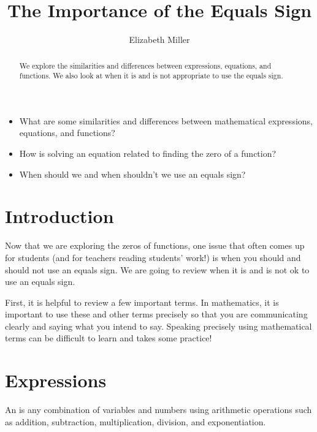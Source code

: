 \documentclass{ximera}
\author{Elizabeth Miller}
\title{The Importance of the Equals Sign}
\begin{document}
\begin{abstract}
 We explore the similarities and differences between expressions, equations, and functions.  We also look at when it is and is not appropriate to use the equals sign.
\end{abstract}
\maketitle



\begin{motivatingQuestions}\begin{itemize}
\item What are some similarities and differences between mathematical expressions, equations, and functions?
\item How is solving an equation related to finding the zero of a function?
\item When should we and when shouldn't we use an equals sign?
\end{itemize}\end{motivatingQuestions}



\section{Introduction}
Now that we are exploring the zeros of functions, one issue that often comes up for students (and for teachers reading students' work!) is when you should and should not use an equals sign.  We are going to review when it is and is not ok to use an equals sign.

First, it is helpful to review a few important terms.  In mathematics, it is important to use these and other terms precisely so that you are communicating clearly and saying what you intend to say.  Speaking precisely using mathematical terms can be difficult to learn and takes some practice!

\section{Expressions}

\begin{definition}
An  is any combination of variables and numbers using arithmetic operations such as addition, subtraction, multiplication, division, and exponentiation.
\end{definition}
\end{document}
